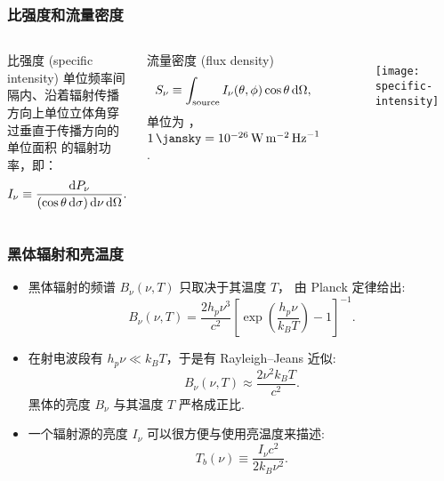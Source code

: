 \documentclass{beamer}
\begin{document}
\begin{frame}[subsec]
  \frametitle{比强度和流量密度}
  \begin{columns}[onlytextwidth]
      \begin{alertblock}{比强度 (specific intensity)}
        \smallskip
        单位频率间隔内、沿着辐射传播方向上单位立体角穿过垂直于传播方向的单位面积
        的辐射功率，即：
        \begin{equation}
          I_{\nu} \equiv
            \frac{\text{d}P_{\nu}}{(\cos\theta\,\text{d}\sigma)
              \,\text{d}\nu \,\text{d}\Omega} .
        \end{equation}
      \end{alertblock}

      \begin{alertblock}{流量密度 (flux density)}
        \smallskip
        \begin{equation}
          S_{\nu} \equiv
            \int_{\text{source}} I_{\nu}(\theta,\phi) \cos\theta \,\text{d}\Omega ,
        \end{equation}
        单位为 \si{\jansky}，
        $\SI{1}{\jansky} = \SI{e-26}{\watt\per\square\meter\per\hertz}$.
      \end{alertblock}

      \begin{figure}
        \centering
        \texttt{[image: specific-intensity]}
      \end{figure}
  \end{columns}

\end{frame}

\begin{frame}[subsec]
  \frametitle{黑体辐射和亮温度}
  \begin{itemize}
    \item \alert{黑体辐射}的频谱 $B_{\nu}(\nu, T)$ 只取决于其温度 $T$，
      由 \alert{Planck 定律}给出:
      \begin{equation}
        B_{\nu}(\nu, T) =
          \frac{2 h_p \nu^3}{c^2} \left[ \exp\left(
            \frac{h_p \nu}{k_B T} \right) - 1 \right]^{-1} .
      \end{equation}
    \item 在射电波段有 $h_p \nu \ll k_B T$，于是有 \alert{Rayleigh--Jeans 近似}:
      \begin{equation}
        B_{\nu}(\nu, T) \approx \frac{2 \nu^2 k_B T}{c^2} .
      \end{equation}
      黑体的亮度 $B_{\nu}$ 与其温度 $T$ 严格成正比.
    \item 一个辐射源的亮度 $I_{\nu}$ 可以很方便与使用\alert{亮温度}来描述:
      \begin{equation}
        T_b(\nu) \equiv \frac{I_{\nu} c^2}{2 k_B \nu^2} .
      \end{equation}
  \end{itemize}
\end{frame}
\end{document}
